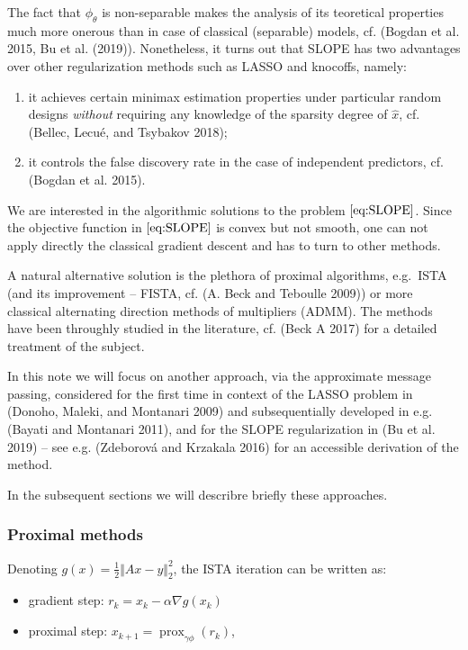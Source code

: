 \documentclass[]{article}
\providecommand{\tightlist}{%
  \setlength{\itemsep}{0pt}\setlength{\parskip}{0pt}}
\begin{document}
The fact that \(\phi_\theta\) is non-separable makes the analysis of its
teoretical properties much more onerous than in case of classical
(separable) models, cf. (Bogdan et al. 2015, Bu et al. (2019)).
Nonetheless, it turns out that SLOPE has two advantages over other
regularization methods such as LASSO and knocoffs, namely:

\begin{enumerate}
\def\labelenumi{\arabic{enumi}.}
\tightlist
\item
  it achieves certain minimax estimation properties under particular
  random designs \emph{without} requiring any knowledge of the sparsity
  degree of \(\widehat{x}\), cf. (Bellec, Lecué, and Tsybakov 2018);
\item
  it controls the false discovery rate in the case of independent
  predictors, cf. (Bogdan et al. 2015).
\end{enumerate}

We are interested in the algorithmic solutions to the problem
\(\eqref{eq:SLOPE}\). Since the objective function in
\(\eqref{eq:SLOPE}\) is convex but not smooth, one can not apply
directly the classical gradient descent and has to turn to other
methods.

A natural alternative solution is the plethora of proximal algorithms,
e.g.~ISTA (and its improvement -- FISTA, cf. (A. Beck and Teboulle
2009)) or more classical alternating direction methods of multipliers
(ADMM). The methods have been throughly studied in the literature, cf.
(Beck A 2017) for a detailed treatment of the subject.

In this note we will focus on another approach, via the approximate
message passing, considered for the first time in context of the LASSO
problem in (Donoho, Maleki, and Montanari 2009) and subsequentially
developed in e.g. (Bayati and Montanari 2011), and for the SLOPE
regularization in (Bu et al. 2019) -- see e.g. (Zdeborová and Krzakala
2016) for an accessible derivation of the method.

In the subsequent sections we will describre briefly these approaches.

\subsubsection{Proximal methods}\label{proximal-methods}

Denoting \(g(x)=\frac{1}{2}\Vert Ax - y \Vert_2^2\), the ISTA iteration
can be written as:

\begin{itemize}
\tightlist
\item
  gradient step: \(r_k = x_k - \alpha\nabla g(x_k)\)
\item
  proximal step: \(x_{k+1} = \operatorname{prox}_{\gamma\phi}(r_k)\),
\end{itemize}
\end{document}
